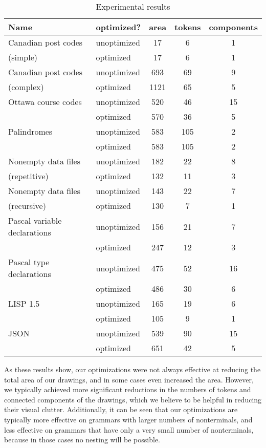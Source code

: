 \documentclass[10pt]{llncs}
\begin{document}
\begin{table}
\begin{center}
  \begin{tabular}{| l | l | c | c | c |}
    \hline
    	\textbf{Name} & \textbf{optimized?} & \textbf{area} & \textbf{tokens} & \textbf{components} \\ \hline
	Canadian post codes & unoptimized & 17 & 6 & 1 \\
	(simple) & optimized & 17 & 6 & 1 \\ \hline
	Canadian post codes & unoptimized  & 693 & 69 & 9 \\
	(complex) & optimized & 1121 & 65 & 5 \\ \hline
	Ottawa course codes & unoptimized & 520 &  46 & 15 \\
	& optimized & 570 & 36 & 5 \\ \hline
	Palindromes & unoptimized & 583 & 105 & 2 \\
	& optimized & 583 & 105 & 2 \\ \hline
	Nonempty data files & unoptimized & 182 & 22 & 8 \\
	(repetitive) & optimized  & 132 & 11 & 3 \\ \hline
	Nonempty data files & unoptimized & 143 & 22 & 7 \\
	(recursive) & optimized & 130 & 7 & 1 \\ \hline
	Pascal variable declarations & unoptimized & 156 & 21 & 7 \\
	& optimized & 247 & 12 & 3 \\ \hline
	Pascal type declarations & unoptimized & 475 & 52 & 16 \\
	& optimized & 486 & 30 & 6 \\ \hline
	LISP 1.5 & unoptimized & 165 & 19 & 6 \\
	& optimized & 105 & 9 & 1 \\ \hline
	JSON & unoptimized & 539 & 90 & 15 \\
	& optimized & 651 & 42 & 5 \\ \hline
  \end{tabular}
\end{center}
\caption{Experimental results}
\label{tbl:x}
\end{table}

As these results show, our optimizations were not always effective at reducing the total area of our drawings, and in some cases even increased the area. However, we typically achieved more significant reductions in the numbers of tokens and connected components of the drawings, which we believe to be helpful in reducing their visual clutter. Additionally, it can be seen that our optimizations are typically more effective on grammars with larger numbers of nonterminals, and less effective on grammars that have only a very small number of nonterminals, because in those cases no nesting will be possible.
\end{document}
